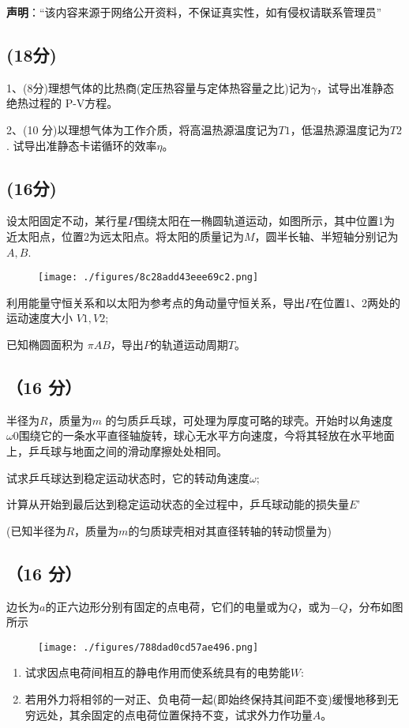 
\textbf{声明}：“该内容来源于网络公开资料，不保证真实性，如有侵权请联系管理员”

\subsection{(18分)}
1、(8分)理想气体的比热商(定压热容量与定体热容量之比)记为$\gamma$，试导出准静态绝热过程的 P-V方程。

2、(10 分)以理想气体为工作介质，将高温热源温度记为$T1$，低温热源温度记为$T2$.
试导出准静态卡诺循环的效率$\eta$。
\subsection{(16分)}
设太阳固定不动，某行星$P$围绕太阳在一椭圆轨道运动，如图所示，其中位置1为近太阳点，位置2为远太阳点。将太阳的质量记为$M$，圆半长轴、半短轴分别记为$A,B$.
\begin{figure}[ht]
\centering
\texttt{[image: ./figures/8c28add43eee69c2.png]}
\caption{} \label{fig_PKU200_1}
\end{figure}
利用能量守恒关系和以太阳为参考点的角动量守恒关系，导出$P$在位置1、2两处的运动速度大小 $V1,V2$;

已知椭圆面积为 $\pi AB$，导出$P$的轨道运动周期$T$。
\subsection{（16 分）}
半径为$R$，质量为$m$ 的匀质乒乓球，可处理为厚度可略的球壳。开始时以角速度$\omega0$围绕它的一条水平直径轴旋转，球心无水平方向速度，今将其轻放在水平地面上，乒乓球与地面之间的滑动摩擦处处相同。

试求乒乓球达到稳定运动状态时，它的转动角速度$\omega$;

计算从开始到最后达到稳定运动状态的全过程中，乒乓球动能的损失量$E$'

(已知半径为$R$，质量为$m$的匀质球壳相对其直径转轴的转动惯量为)
\subsection{（16 分）}
边长为$a$的正六边形分别有固定的点电荷，它们的电量或为$Q$，或为$-Q$，分布如图所示
\begin{figure}[ht]
\centering
\texttt{[image: ./figures/788dad0cd57ae496.png]}
\caption{} \label{fig_PKU200_2}
\end{figure}
\begin{enumerate}
\item 试求因点电荷间相互的静电作用而使系统具有的电势能$W$:
\item 若用外力将相邻的一对正、负电荷一起(即始终保持其间距不变)缓慢地移到无穷远处，其余固定的点电荷位置保持不变，试求外力作功量$A$。
\end{enumerate}
